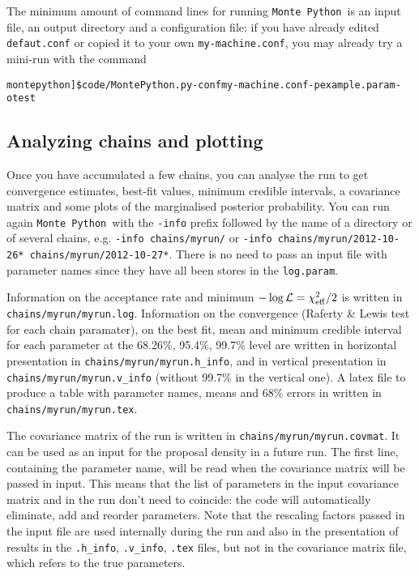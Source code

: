 \documentclass[10pt]{article}
\newcommand{\MP}{\texttt{Monte Python}}
\begin{document}
  The minimum amount of command lines for running \MP~is an input file, an output directory and a configuration file: if you have already edited \verb?defaut.conf? or copied it to your own \verb?my-machine.conf?, you may already try a mini-run with the command 
    \begin{alltt}
    montepython]\$ code/MontePython.py -conf my-machine.conf -p example.param -o test
    \end{alltt}

\subsection{Analyzing chains and plotting}

Once you have accumulated a few chains, you can analyse the run to get convergence estimates, best-fit values, minimum credible intervals, a covariance matrix  and some plots of the marginalised posterior probability. You can run again \MP~with the \verb?-info? prefix followed by the name of a directory or of several chains, e.g.
\verb?-info chains/myrun/? or \verb?-info chains/myrun/2012-10-26* chains/myrun/2012-10-27*?.
There is no need to pass an input file with parameter names since they have all been stores in the \verb?log.param?.

Information on the acceptance rate and minimum $-\log{\cal L}=\chi^2_{\rm eff}/2$ is written in \verb?chains/myrun/myrun.log?. Information on the convergence (Raferty \& Lewis test for each chain paramater), on the best fit, mean and minimum credible interval for each parameter at the 68.26\%, 95.4\%, 99.7\% level are written in horizontal presentation in \verb?chains/myrun/myrun.h_info?, and in vertical presentation in \verb?chains/myrun/myrun.v_info? (without 99.7\% in the vertical one). A latex file to produce a table with parameter names, means and 68\% errors in written in \verb?chains/myrun/myrun.tex?.

The covariance matrix of the run is written in \verb?chains/myrun/myrun.covmat?. It can be used as an input for the proposal density in a future run. The first line, containing the parameter name, will be read when the covariance matrix will be passed in input. This means that 
the list of parameters in the input covariance matrix and in the run don't need to coincide: the code will automatically eliminate, add and reorder parameters. Note that the rescaling factors passed in the input file are used internally during the run and also in the presentation of results in the \verb?.h_info?, \verb?.v_info?, \verb?.tex? files, but not in the covariance matrix file, which refers to the true parameters.
\end{document}
